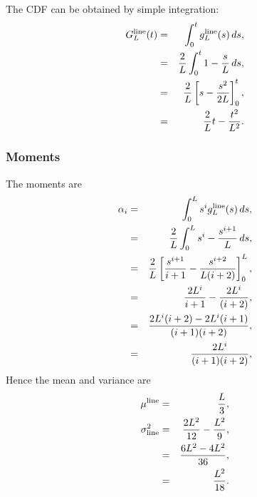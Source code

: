 The CDF can be obtained by simple integration:
\begin{eqnarray}
  G^{\rm line}_L(t)
     & = & \int_0^t g^{\rm line}_L(s) \, ds, \nonumber \\
     & = & \frac{2}{L} \int_0^t  1-\frac{s}{L} \, ds, \nonumber \\
     & = & \frac{2}{L} \left[ s - \frac{s^2}{2L} \right]_0^t, \nonumber \\
     & = &  \frac{2}{L} t - \frac{t^2}{L^2}. \\
  \label{eq:line_cdf}  
\end{eqnarray}

\subsubsection{Moments}

The moments are
\begin{eqnarray}
  \alpha_i & = & \int_0^L s^i g^{\rm line}_L(s) \, ds, \nonumber \\
           & = & \frac{2}{L}  \int_0^L s^i- \frac{s^{i+1}}{L}  \, ds, \nonumber \\
           & = & \frac{2}{L} \left[ \frac{s^{i+1}}{i+1} - \frac{s^{i+2}}{L(i+2)} \right]_0^L, \nonumber \\
           & = & \frac{2 L^{i}}{i+1} - \frac{2 L^{i}}{(i+2)}, \nonumber \\
           & = & \frac{2 L^{i} (i+2) - 2 L^{i}(i+1)}{(i+1)(i+2)} , \nonumber \\
           & = & \frac{2 L^{i}}{(i+1)(i+2)} , \nonumber \\
  \label{eq:line_moments}
\end{eqnarray}
Hence the mean and variance are
\begin{eqnarray}
  \mu^{\rm line} & = & \frac{L}{3}, \\
  \label{eq:line_mean}
  \sigma^2_{\rm line}
      & = & \frac{2 L^{2}}{12} - \frac{L^2}{9}, \nonumber \\
      & = & \frac{6 L^{2} -4 L^2}{36}, \nonumber \\
      & = & \frac{L^{2}}{18}.
  \label{eq:line_var}
\end{eqnarray}


